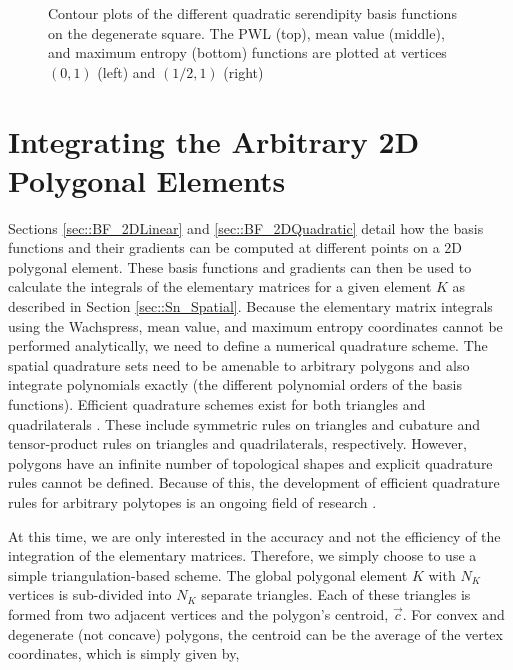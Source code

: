 \begin{figure}
{\begin{subfigure}[b]{0.375\textwidth}
	\end{subfigure}
}
\vspace{2mm}
\caption[Contour plots of the quadratic basis functions on the degenerate square.]{Contour plots of the different quadratic serendipity basis functions on the degenerate square. The PWL (top), mean value (middle), and maximum entropy (bottom) functions are plotted at vertices $(0,1)$ (left) and $(1/2,1)$ (right)}
\label{fig::2DQuadSer_degsquare_basis_functions}
\end{figure}


\section{Integrating the Arbitrary 2D Polygonal Elements}
\label{sec::BF_2DIntegration}

Sections \ref{sec::BF_2DLinear} and \ref{sec::BF_2DQuadratic} detail how the basis functions and their gradients can be computed at different points on a 2D polygonal element. These basis functions and gradients can then be used to calculate the integrals of the elementary matrices for a given element $K$ as described in Section \ref{sec::Sn_Spatial}. Because the elementary matrix integrals using the Wachspress, mean value, and maximum entropy coordinates cannot be performed analytically, we need to define a numerical quadrature scheme. The spatial quadrature sets need to be amenable to arbitrary polygons and also integrate polynomials exactly (the different polynomial orders of the basis functions). Efficient quadrature schemes exist for both triangles and quadrilaterals \cite{silvester1970symmetric,dunavant1985high,wandzurat2003symmetric,lyness1994survey,cools1987construction}. These include symmetric rules on triangles and cubature and tensor-product rules on triangles and quadrilaterals, respectively. However, polygons have an infinite number of topological shapes and explicit quadrature rules cannot be defined. Because of this, the development of efficient quadrature rules for arbitrary polytopes is an ongoing field of research \cite{nooijen1990symmetric,dasgupta2003integration,mousavi2010generalized}.

At this time, we are only interested in the accuracy and not the efficiency of the integration of the elementary matrices. Therefore, we simply choose to use a simple triangulation-based scheme. The global polygonal element $K$ with $N_K$ vertices is sub-divided into $N_K$ separate triangles. Each of these triangles is formed from two adjacent vertices and the polygon's centroid, $\vec{c}$. For convex and degenerate (not concave) polygons, the centroid can be the average of the vertex coordinates, which is simply given by,


